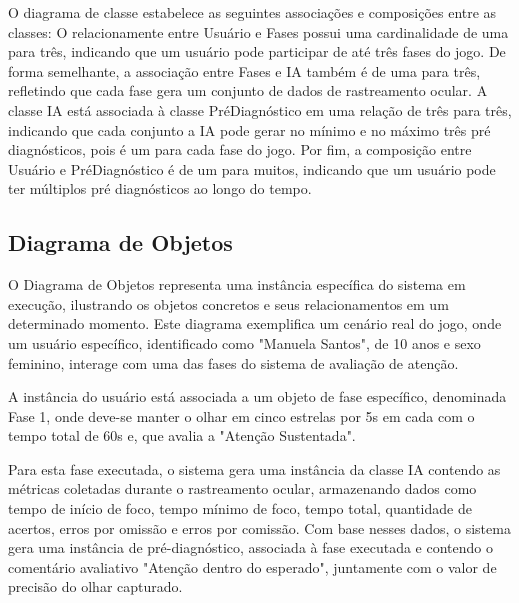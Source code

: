 \documentclass[
  a4paper,%
  12pt,%
  english,%
  brazilian,%
]{article}
\begin{document}
    O diagrama de classe estabelece as seguintes associações e composições entre as classes: O relacionamente entre Usuário e Fases possui uma cardinalidade de uma para três, indicando que um usuário pode participar de até três fases do jogo. De forma semelhante, a associação entre Fases e IA também é de uma para três, refletindo que cada fase gera um conjunto de dados de rastreamento ocular. A classe IA está associada à classe PréDiagnóstico em uma relação de três para três, indicando que cada conjunto a IA pode gerar no mínimo e no máximo três pré diagnósticos, pois é um para cada fase do jogo. Por fim, a composição entre Usuário e PréDiagnóstico é de um para muitos, indicando que um usuário pode ter múltiplos pré diagnósticos ao longo do tempo.

    \subsection*{Diagrama de Objetos}

    O Diagrama de Objetos representa uma instância específica do sistema em execução, ilustrando os objetos concretos e seus relacionamentos em um determinado momento. Este diagrama exemplifica um cenário real do jogo, onde um usuário específico, identificado como "Manuela Santos", de 10 anos e sexo feminino, interage com uma das fases do sistema de avaliação de atenção.
    
    A instância do usuário está associada a um objeto de fase específico, denominada Fase 1, onde deve-se manter o olhar em cinco estrelas por 5s em cada com o tempo total de 60s e, que avalia a "Atenção Sustentada".
    
    Para esta fase executada, o sistema gera uma instância da classe IA contendo as métricas coletadas durante o rastreamento ocular, armazenando dados como tempo de início de foco, tempo mínimo de foco, tempo total, quantidade de acertos, erros por omissão e erros por comissão. Com base nesses dados, o sistema gera uma instância de pré-diagnóstico, associada à fase executada e contendo o comentário avaliativo "Atenção dentro do esperado", juntamente com o valor de precisão do olhar capturado.
    
\end{document}
